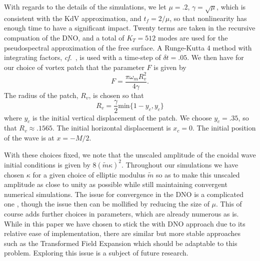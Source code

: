 \documentclass[a4paper,11pt]{article}
\newcommand{\cf}{{\it cf.}~}
\begin{document}
With regards to the details of the simulations, we let $\mu=.2$, $\gamma = \sqrt{\mu}$, which is consistent with the KdV approximation, and $t_{f}=2/\mu$, so that nonlinearity has enough time to have a significant impact.  Twenty terms are taken in the recursive compuation of the DNO, and a total of $K_{T}=512$ modes are used for the pseudospectral approximation of the free surface.  A Runge-Kutta 4 method with integrating factors, \cf \cite{trefethen}, is used with a time-step of $\delta t = .05$.   We then have for our choice of vortex patch that the parameter $F$ is given by 
\[
F = \frac{\pi \omega_{m}R_{v}^{2}}{4\gamma}.
\]
The radius of the patch, $R_{v}$, is chosen so that
\[
R_{v} = \frac{\gamma}{2}\mbox{min}\{1-y_{c},y_{c}\}
\]
where $y_{c}$ is the initial vertical displacement of the patch.  We choose $y_{c}=.35$, so that $R_{v}\approx.1565$.  The initial horizontal displacement is $x_{c}=0$.  The initial position of the wave is at $x=-M/2$.  

With these choices fixed, we note that the unscaled amplitude of the cnoidal wave initial conditions is given by $8(\tilde{m}\kappa)^{2}$.  Throughout our simulations we have chosen $\kappa$ for a given choice of elliptic modulus $\tilde{m}$ so as to make this unscaled amplitude as close to unity as possible while still maintaining convergent numerical simulations.  The issue for convergence in the DNO is a complicated one \cite{guyenne,wilkening}, though the issue then can be mollified by reducing the size of $\mu$.  This of course adds further choices in parameters, which are already numerous as is.  While in this paper we have chosen to stick the with DNO approach due to its relative ease of implementation, there are similar but more stable approaches such as the Transformed Field Expansion \cite{nicholls} which should be adaptable to this problem.  Exploring this issue is a subject of future research.   
\end{document}

